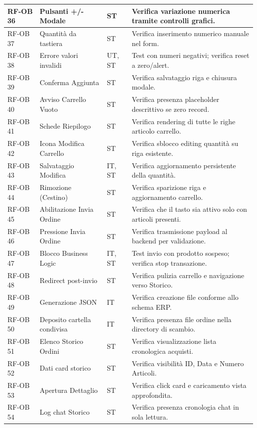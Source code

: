 \documentclass[a4paper,11pt,oneside]{scrartcl}
\begin{document}
\begin{longtable}{|p{1.5cm}|p{4.5cm}|p{1.8cm}|p{6cm}|}
RF-OB 36 & Pulsanti +/- Modale & ST & Verifica variazione numerica tramite controlli grafici. \\ \hline
RF-OB 37 & Quantità da tastiera & ST & Verifica inserimento numerico manuale nel form. \\ \hline
RF-OB 38 & Errore valori invalidi & UT, ST & Test con numeri negativi; verifica reset a zero/alert. \\ \hline
RF-OB 39 & Conferma Aggiunta & ST & Verifica salvataggio riga e chiusura modale. \\ \hline
RF-OB 40 & Avviso Carrello Vuoto & ST & Verifica presenza placeholder descrittivo se zero record. \\ \hline
RF-OB 41 & Schede Riepilogo & ST & Verifica rendering di tutte le righe articolo carrello. \\ \hline
RF-OB 42 & Icona Modifica Carrello & ST & Verifica sblocco editing quantità su riga esistente. \\ \hline
RF-OB 43 & Salvataggio Modifica & IT, ST & Verifica aggiornamento persistente della quantità. \\ \hline
RF-OB 44 & Rimozione (Cestino) & ST & Verifica sparizione riga e aggiornamento carrello. \\ \hline
RF-OB 45 & Abilitazione Invia Ordine & ST & Verifica che il tasto sia attivo solo con articoli presenti. \\ \hline
RF-OB 46 & Pressione Invia Ordine & ST & Verifica trasmissione payload al backend per validazione. \\ \hline
RF-OB 47 & Blocco Business Logic & IT, ST & Test invio con prodotto sospeso; verifica stop transazione. \\ \hline
RF-OB 48 & Redirect post-invio & ST & Verifica pulizia carrello e navigazione verso Storico. \\ \hline
RF-OB 49 & Generazione JSON & IT & Verifica creazione file conforme allo schema ERP. \\ \hline
RF-OB 50 & Deposito cartella condivisa & IT & Verifica presenza file ordine nella directory di scambio. \\ \hline
RF-OB 51 & Elenco Storico Ordini & ST & Verifica visualizzazione lista cronologica acquisti. \\ \hline
RF-OB 52 & Dati card storico & ST & Verifica visibilità ID, Data e Numero Articoli. \\ \hline
RF-OB 53 & Apertura Dettaglio & ST & Verifica click card e caricamento vista approfondita. \\ \hline
RF-OB 54 & Log chat Storico & ST & Verifica presenza cronologia chat in sola lettura. \\ \hline

\end{longtable}
\end{document}
